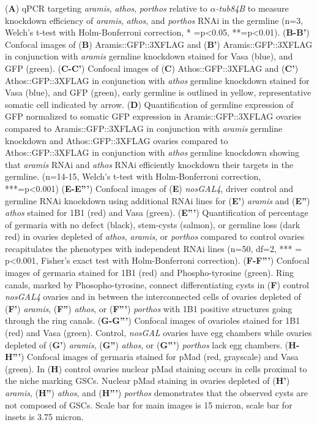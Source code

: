 \documentclass[12pt,oneside]{reedthesis}
\begin{document}
\setlength\parindent{0pt}(\textbf{A}) qPCR targeting \emph{aramis}, \emph{athos}, \emph{porthos} relative to \(\alpha\)\emph{-tub84B} to measure knockdown efficiency of \emph{aramis}, \emph{athos}, and \emph{porthos} RNAi in the germline (n=3, Welch's t-test with Holm-Bonferroni correction, * =p\textless0.05, **=p\textless0.01). (\textbf{B-B'}) Confocal images of (\textbf{B}) Aramis::GFP::3XFLAG and (\textbf{B'}) Aramis::GFP::3XFLAG in conjunction with \emph{aramis} germline knockdown stained for Vasa (blue), and GFP (green). (\textbf{C-C'}) Confocal images of (\textbf{C}) Athos::GFP::3XFLAG and (\textbf{C'}) Athos::GFP::3XFLAG in conjunction with \emph{athos} germline knockdown stained for Vasa (blue), and GFP (green), early germline is outlined in yellow, representative somatic cell indicated by arrow. (\textbf{D}) Quantification of germline expression of GFP normalized to somatic GFP expression in Aramis::GFP::3XFLAG ovaries compared to Aramis::GFP::3XFLAG in conjunction with \emph{aramis} germline knockdown and Athos::GFP::3XFLAG ovaries compared to Athos::GFP::3XFLAG in conjunction with \emph{athos} germline knockdown showing that \emph{aramis} RNAi and \emph{athos} RNAi efficiently knockdown their targets in the germline. (n=14-15, Welch's t-test with Holm-Bonferroni correction, ***=p\textless0.001) (\textbf{E-E'''}) Confocal images of (\textbf{E}) \emph{nosGAL4}, driver control and germline RNAi knockdown using additional RNAi lines for (\textbf{E'}) \emph{aramis} and (\textbf{E''}) \emph{athos} stained for 1B1 (red) and Vasa (green). (\textbf{E'''}) Quantification of percentage of germaria with no defect (black), stem-cysts (salmon), or germline loss (dark red) in ovaries depleted of \emph{athos}, \emph{aramis}, or \emph{porthos} compared to control ovaries recapitulates the phenotypes with independent RNAi lines (n=50, df=2, *** = p\textless0.001, Fisher's exact test with Holm-Bonferroni correction). (\textbf{F-F'''}) Confocal images of germaria stained for 1B1 (red) and Phospho-tyrosine (green). Ring canals, marked by Phosopho-tyrosine, connect differentiating cysts in (\textbf{F}) control \emph{nosGAL4} ovaries and in between the interconnected cells of ovaries depleted of (\textbf{F'}) \emph{aramis}, (\textbf{F''}) \emph{athos}, or (\textbf{F'''}) \emph{porthos} with 1B1 positive structures going through the ring canals. (\textbf{G-G'''}) Confocal images of ovarioles stained for 1B1 (red) and Vasa (green). Control, \emph{nosGAL} ovaries have egg chambers while ovaries depleted of (\textbf{G'}) \emph{aramis}, (\textbf{G''}) \emph{athos}, or (\textbf{G'''}) \emph{porthos} lack egg chambers. (\textbf{H-H'''}) Confocal images of germaria stained for pMad (red, grayscale) and Vasa (green). In (\textbf{H}) control ovaries nuclear pMad staining occurs in cells proximal to the niche marking GSCs. Nuclear pMad staining in ovaries depleted of (\textbf{H'}) \emph{aramis}, (\textbf{H''}) \emph{athos}, and (\textbf{H'''}) \emph{porthos} demonstrates that the observed cysts are not composed of GSCs. Scale bar for main images is 15 micron, scale bar for insets is 3.75 micron.
\end{document}
